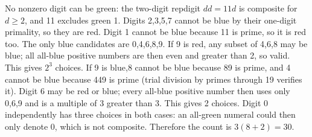 No nonzero digit can be green: the two-digit repdigit $dd=11d$ is composite for $d\ge2$, and 11 excludes green 1. Digits 2,3,5,7 cannot be blue by their one-digit primality, so they are red. Digit 1 cannot be blue because 11 is prime, so it is red too. The only blue candidates are 0,4,6,8,9. If 9 is red, any subset of 4,6,8 may be blue; all all-blue positive numbers are then even and greater than 2, so valid. This gives $2^3$ choices. If 9 is blue,8 cannot be blue because 89 is prime, and 4 cannot be blue because 449 is prime (trial division by primes through 19 verifies it). Digit 6 may be red or blue; every all-blue positive number then uses only 0,6,9 and is a multiple of 3 greater than 3. This gives 2 choices. Digit 0 independently has three choices in both cases: an all-green numeral could then only denote 0, which is not composite. Therefore the count is $3(8+2)=\boxed{30}$.

